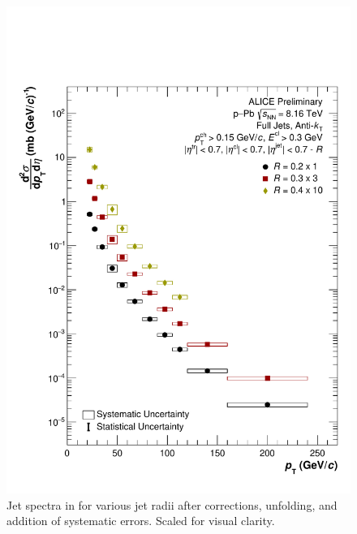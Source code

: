 \begin{figure}
    \centering
    \includegraphics[width=15cm]{figures/pPbFigures/FinalResults/Bayes_reg6.pdf}
    \caption{Jet spectra in \pPb for various jet radii after corrections, unfolding, and addition of systematic errors. Scaled for visual clarity.}
    \label{fig:finalSpectrapPb}
\end{figure}

